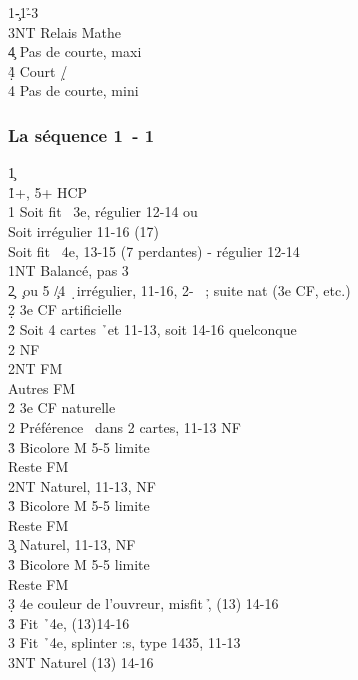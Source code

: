 \documentclass[a4paper]{article}
\begin{document}
\begin{bidtable}
1\c-1\h-3\s\+\\
3NT \> Relais Mathe\+\\
4\c \> Pas de courte, maxi\\
4\d\h \> Court \d /\h \\
4\s \> Pas de courte, mini\-\-
\end{bidtable}

\subsubsection{La séquence 1\pdfc\ - 1\pdfh}

\begin{bidtable}
1\c\+\\
1\h {}+\s , 5+ HCP\+\\
1\s \> Soit fit \s\ 3e, régulier 12-14 ou\\
\>Soit irrégulier 11-16 (17) \\
\>Soit fit \s\ 4e, 13-15 (7 perdantes) - régulier 12-14\\
1NT \> Balancé, pas 3\s \\
2\c {} \c\ ou 5 \c /4 \d\ irrégulier, 11-16, 2- \s\ ; suite nat (3e CF, etc.)\+\\
2\d \> 3e CF artificielle\+\\
2\h \> Soit 4 cartes \h\ et 11-13, soit 14-16 quelconque\+\\
2\s \> NF\\
2NT \> FM\\
Autres \> FM\-\-\\
2\h \> 3e CF naturelle\+\\
2\s \> Préférence \s\ dans 2 cartes, 11-13 NF\+\\
3\h \> Bicolore M 5-5 limite\\
Reste \> FM\-\\
2NT \> Naturel, 11-13, NF\+\\
3\h \> Bicolore M 5-5 limite\\
Reste \> FM\-\\
3\c \> Naturel, 11-13, NF\+\\
3\h \> Bicolore M 5-5 limite\\
Reste \> FM\-\\
3\d \> 4e couleur de l'ouvreur, misfit \h , (13) 14-16\\
3\h \> Fit \h\ 4e, (13)14-16\\
3\s \> Fit \h\ 4e, splinter :s, type 1435, 11-13\\
3NT \> Naturel (13) 14-16\\

\end{bidtable}
\end{document}
